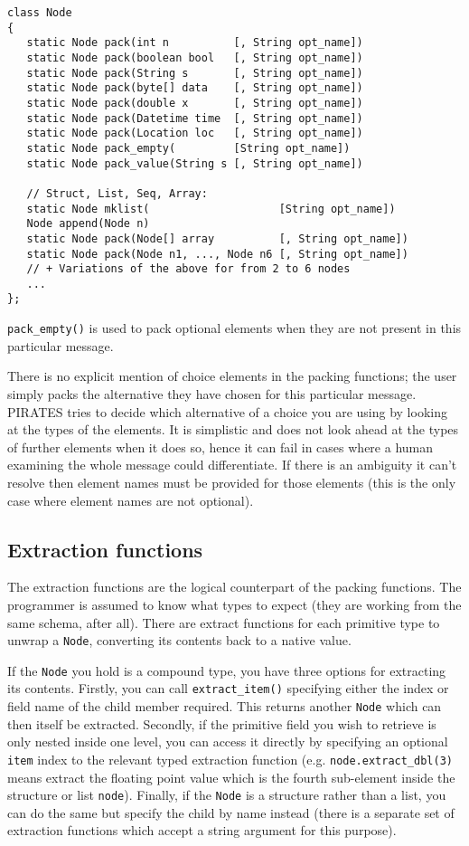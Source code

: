 \documentclass[12pt,a4paper,twoside]{article}
\renewcommand{\_}{\texttt{\symbol{95}}}
\begin{document}
\begin{verbatim}
class Node
{
   static Node pack(int n          [, String opt_name])
   static Node pack(boolean bool   [, String opt_name])
   static Node pack(String s       [, String opt_name])
   static Node pack(byte[] data    [, String opt_name])
   static Node pack(double x       [, String opt_name])
   static Node pack(Datetime time  [, String opt_name])
   static Node pack(Location loc   [, String opt_name])
   static Node pack_empty(         [String opt_name])
   static Node pack_value(String s [, String opt_name])

   // Struct, List, Seq, Array:
   static Node mklist(                    [String opt_name])
   Node append(Node n)
   static Node pack(Node[] array          [, String opt_name])
   static Node pack(Node n1, ..., Node n6 [, String opt_name])
   // + Variations of the above for from 2 to 6 nodes
   ...
};
\end{verbatim}

\verb^pack_empty()^ is used to pack
optional elements when they are not present in this particular message.

There is no explicit mention of choice elements in the
packing functions; the user simply packs the alternative they have chosen for
this particular message. PIRATES tries to decide which alternative of a choice
you are using by looking at the types of the elements. It is
simplistic and does not look ahead at the types of further elements when it
does so, hence it can fail in cases where a human examining the whole message
could differentiate. If there is an ambiguity it can't resolve then
element names must be provided for those elements (this is the only
case where element names are not optional).

\subsection{Extraction functions}

The extraction functions are the logical counterpart of the packing
functions. The programmer is assumed to know what types to expect
(they are working from the same schema, after all). There are
extract functions for each primitive type to unwrap a \verb^Node^,
converting its contents back to a native value.

If the \verb^Node^ you hold is a compound type, you have three options for
extracting its contents. Firstly, you can call \verb^extract_item()^ specifying
either the index or field name of the child member required. This returns
another \verb^Node^ which can then itself be extracted. Secondly, if the
primitive field you wish to retrieve is only nested inside one level, you can
access it directly by specifying an optional \verb^item^ index to the relevant
typed extraction function (e.g. \verb^node.extract_dbl(3)^ means extract the
floating point value which is the fourth sub-element inside the structure or
list \verb^node^). Finally, if the \verb^Node^ is a structure rather than
a list, you can do the same but specify the child by name
instead (there is a separate set of extraction functions which accept a string
argument for this purpose).
\end{document}
